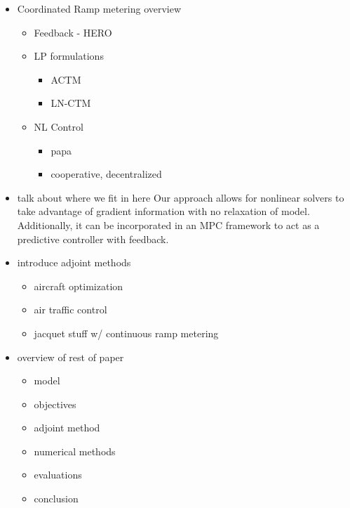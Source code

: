 
\begin{itemize}
  \item Coordinated Ramp metering overview
  \begin{itemize}
    \item Feedback - HERO \cite{Papamichail2008}
    \item LP formulations
    \begin{itemize}
      \item ACTM \cite{gomes2006optimal}
      \item LN-CTM \cite{Muralidharana}
    \end{itemize}
    \item NL Control
    \begin{itemize}
          \item \cite{Kotsialos2004} papa
          \item cooperative, decentralized \cite{Ramon2013}
        \end{itemize}
  \end{itemize}
  \item talk about where we fit in here
  Our approach allows for nonlinear solvers to take advantage of gradient information with no relaxation of model. Additionally, it can be incorporated in an MPC framework to act as a predictive controller with feedback.
  \item introduce adjoint methods
  \begin{itemize}
    \item aircraft optimization \cite{Giles2000}
    \item air traffic control \cite{Bayen2006}
    \item jacquet stuff w/ continuous ramp metering \cite{Jacquet2005}
  \end{itemize}
  \item overview of rest of paper
  \begin{itemize}
    \item model
    \item objectives
    \item adjoint method
    \item numerical methods
    \item evaluations
    \item conclusion
  \end{itemize}
\end{itemize}